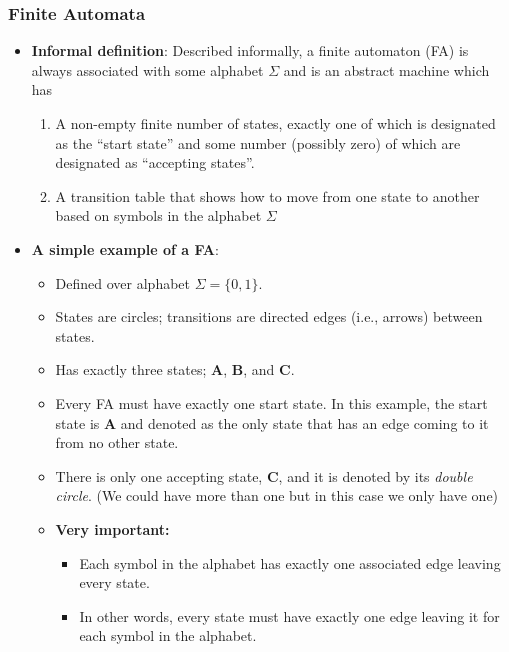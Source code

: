 \documentclass{report}
\begin{document}
    \subsubsection{Finite Automata}
    \begin{itemize}
        \item \textbf{Informal definition}: Described informally, a finite automaton (FA) is always associated with some alphabet $\Sigma$ and is an abstract machine which has 
            \begin{enumerate}
                \item A non-empty finite number of states, exactly one of which is designated as the “start state” and some number (possibly zero) of which are designated as “accepting states”.
                \item A transition table that shows how to move from one state to another based on symbols in the alphabet $\Sigma$
            \end{enumerate}
        \item \textbf{A simple example of a FA}:
            \bigbreak \noindent 
            \begin{itemize}
                \item Defined over alphabet $\Sigma = \{0, 1\}$.
                \item States are circles; transitions are directed edges (i.e., arrows) between states.
                \item Has exactly three states; \textbf{A}, \textbf{B}, and \textbf{C}.
                \item Every FA must have exactly one start state. In this example, the start state is \textbf{A} and denoted as the only state that has an edge coming to it from no other state.
                \item There is only one accepting state, \textbf{C}, and it is denoted by its \textit{double circle}. (We could have more than one but in this case we only have one)
                \item \textbf{Very important:}
                    \begin{itemize}
                        \item Each symbol in the alphabet has exactly one associated edge leaving every state.
                        \item In other words, every state must have exactly one edge leaving it for each symbol in the alphabet.
                    \end{itemize}

\end{itemize}
\end{itemize}
\end{document}
